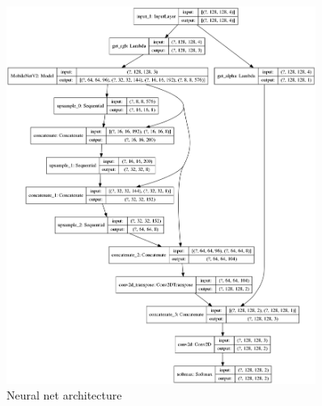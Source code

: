 \documentclass[12pt,a4paper]{article}
\begin{document}
    \begin{figure}[p]
        \centering
        \includegraphics[width=0.9\textwidth]{images/full_model}
        \caption{Neural net architecture}
        \label{f:model}
    \end{figure}
\end{document}
